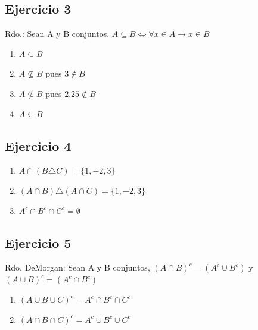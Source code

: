 \subsection{Ejercicio 3}
Rdo.: Sean A y B conjuntos. $ A \subseteq B \iff \forall x \in A \rightarrow x \in B$
\begin{enumerate}[label=(\alph*)]
    \item $A \subseteq B$
    \item $A \not \subseteq B$ pues $3 \not \in B$
    \item $A \not \subseteq B$ pues $2.25 \not \in B$
    \item $A \subseteq B$
\end{enumerate}

\subsection{Ejercicio 4}
\begin{enumerate}[label=(\alph*)]
    \item $A \cap (B \triangle C) = \{ 1,-2,3 \}$
    \item $(A \cap B) \triangle (A \cap C) = \{1,-2,3\}$
    \item $A^c \cap B^c \cap C^c = \emptyset$ 
\end{enumerate}

\subsection{Ejercicio 5}
Rdo. DeMorgan: Sean A y B conjuntos, $(A \cap B)^c = (A^c \cup B^c)$ y $(A \cup B)^c = (A^c \cap B^c)$

\begin{enumerate}
    \item $(A \cup B \cup C)^c = A^c \cap B^c \cap C^c$
    \item $(A \cap B \cap C)^c = A^c \cup B^c \cup C^c$
\end{enumerate}

